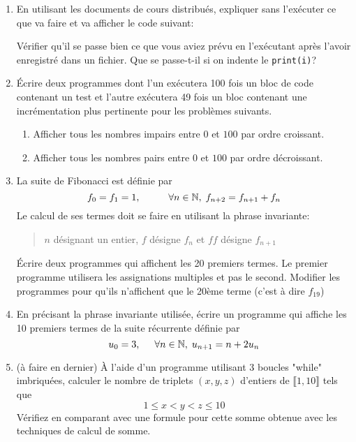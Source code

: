 \begin{enumerate}
  \item En utilisant les documents de cours distribués, expliquer sans l'exécuter ce que va faire et va afficher le code suivant:
  
Vérifier qu'il se passe bien ce que vous aviez prévu en l'exécutant après l'avoir enregistré dans un fichier. Que se passe-t-il si on indente le \texttt{print(i)}?

  \item \'Ecrire deux programmes dont l'un exécutera 100 fois un bloc de code contenant un test et l'autre exécutera 49 fois un bloc contenant une incrémentation plus pertinente pour les problèmes suivants.
\begin{enumerate}
  \item Afficher tous les nombres impairs entre $0$ et $100$ par ordre croissant.
  \item Afficher tous les nombres pairs entre $0$ et $100$ par ordre décroissant.
\end{enumerate}

  \item La suite de Fibonacci est définie par
\begin{displaymath}
  f_0 = f_1 = 1, \hspace{1cm}\forall n \in \mathbb{N},\; f_{n+2} = f_{n+1} + f_n
\end{displaymath}
Le calcul de ses termes doit se faire en utilisant la phrase invariante:
\begin{quote}
  \og $n$ désignant un entier, $f$ désigne $f_n$ et $ff$ désigne $f_{n+1}$\fg
\end{quote}
\'Ecrire deux programmes qui affichent les 20 premiers termes. Le premier programme utilisera les assignations multiples et pas le second. Modifier les programmes pour qu'ils n'affichent que le 20ème terme (c'est à dire $f_{19}$)

  \item En précisant la phrase invariante utilisée, écrire un programme qui affiche les 10 premiers termes de la suite récurrente définie par
\begin{displaymath}
  u_0 = 3, \hspace{0.5cm} \forall n \in \mathbb{N}, \;u_{n+1} = n + 2u_n
\end{displaymath}

  \item (à faire en dernier) \`A l'aide d'un programme utilisant 3 boucles "while" imbriquées, calculer le nombre de triplets $(x,y,z)$ d'entiers de $\llbracket 1, 10 \rrbracket$ tels que
  \begin{displaymath}
  1  \leq x < y < z \leq 10
  \end{displaymath}
Vérifiez en comparant avec une formule pour cette somme obtenue avec les techniques de calcul de somme.
\end{enumerate}
